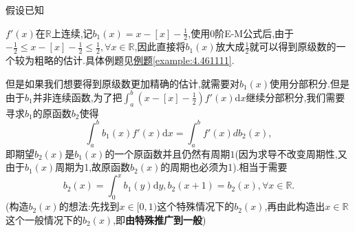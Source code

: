 \documentclass[../../main.tex]{subfiles}%
\begin{document}
\begin{remark}
\hypertarget{remark:利用0阶E-M公式精细估阶的构造}{假设已知}$f'(x)$在$\mathbb{R}$上连续,记\(b_1(x)=x - [x]-\frac{1}{2}\),使用0阶E-M公式后,由于$-\frac{1}{2}\leqslant x-[x]-\frac{1}{2}\leqslant \frac{1}{2},\forall x\in \mathbb{R}$,因此直接将$b_1(x)$放大成$\frac{1}{2}$就可以得到原级数的一个较为粗略的估计.具体例题见\hyperref[example:4.461111]{例题\ref{example:4.461111}}.

但是如果我们想要得到原级数更加精确的估计,就需要对$b_1(x)$使用分部积分.但是由于\(b_1\)并非连续函数,为了把\(\int_{a}^{b}(x - [x]-\frac{1}{2})f'(x)\mathrm{d}x\)继续分部积分,我们需要寻求\(b_1\)的原函数\(b_2\)使得
\[
\int_{a}^{b}b_1(x)f'(x)\mathrm{d}x=\int_{a}^{b}f'(x)db_2(x),
\]
即期望\(b_2(x)\)是$b_1(x)$的一个原函数并且仍然有周期\(1\)(因为求导不改变周期性,又由于$b_1(x)$周期为1,故原函数$b_2(x)$的周期也必须为1).相当于需要
\[
b_2(x)=\int_0^x{b_1(y)\mathrm{d}y},b_2(x+1)=b_2(x),\forall x\in \mathbb{R} .
\]
(构造$b_2(x)$的想法:先找到$x\in [0,1)$这个特殊情况下的$b_2(x)$,再由此构造出$x\in \mathbb{R}$这个一般情况下的$b_2(x)$,即\textbf{由特殊推广到一般})


\end{remark}
\end{document}
